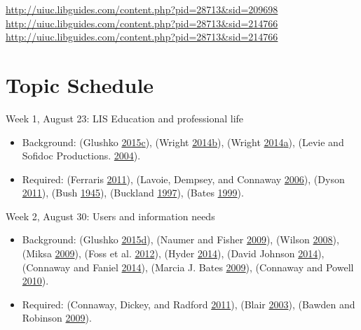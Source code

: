 \documentclass[]{article}
\providecommand{\tightlist}{%
  \setlength{\itemsep}{0pt}\setlength{\parskip}{0pt}}
\begin{document}
\url{http://uiuc.libguides.com/content.php?pid=28713\&sid=209698}
\url{http://uiuc.libguides.com/content.php?pid=28713\&sid=214766}
\url{http://uiuc.libguides.com/content.php?pid=28713\&sid=214766}

\section{Topic Schedule}\label{topic-schedule}

Week 1, August 23: LIS Education and professional life

\begin{itemize}
\tightlist
\item
  Background: (Glushko
  \protect\hyperlink{ref-glushkoux5ffoundationux5f2015}{2015}\protect\hyperlink{ref-glushkoux5ffoundationux5f2015}{c}),
  (Wright
  \protect\hyperlink{ref-wrightux5fsecretux5f2014}{2014}\protect\hyperlink{ref-wrightux5fsecretux5f2014}{b}),
  (Wright
  \protect\hyperlink{ref-wrightux5fcatalogingux5f2014}{2014}\protect\hyperlink{ref-wrightux5fcatalogingux5f2014}{a}),
  (Levie and Sofidoc Productions.
  \protect\hyperlink{ref-levieux5fmanux5f2004}{2004}).
\item
  Required: (Ferraris
  \protect\hyperlink{ref-ferrarisux5fsocialux5f2011}{2011}), (Lavoie,
  Dempsey, and Connaway
  \protect\hyperlink{ref-lavoieux5fmakingux5f2006}{2006}), (Dyson
  \protect\hyperlink{ref-dysonux5fhowux5f2011}{2011}), (Bush
  \protect\hyperlink{ref-bushux5fasux5f1945}{1945}), (Buckland
  \protect\hyperlink{ref-bucklandux5fwhatux5f1997}{1997}), (Bates
  \protect\hyperlink{ref-batesux5finvisibleux5f1999}{1999}).
\end{itemize}

Week 2, August 30: Users and information needs

\begin{itemize}
\tightlist
\item
  Background: (Glushko
  \protect\hyperlink{ref-glushkoux5finteractionsux5f2015}{2015}\protect\hyperlink{ref-glushkoux5finteractionsux5f2015}{d}),
  (Naumer and Fisher
  \protect\hyperlink{ref-naumerux5finformationux5f2009}{2009}), (Wilson
  \protect\hyperlink{ref-wilsonux5finformationux5f2008}{2008}), (Miksa
  \protect\hyperlink{ref-miksaux5finformationux5f2009}{2009}), (Foss et
  al. \protect\hyperlink{ref-fossux5fchildrensux5f2012}{2012}), (Hyder
  \protect\hyperlink{ref-hyderux5freadingux5f2014}{2014}), (David
  Johnson
  \protect\hyperlink{ref-davidux5fjohnsonux5fhealth-relatedux5f2014}{2014}),
  (Connaway and Faniel
  \protect\hyperlink{ref-connawayux5freorderingux5f2014}{2014}), (Marcia
  J. Bates
  \protect\hyperlink{ref-marciaux5fj.ux5fbatesux5finformationux5f2009}{2009}),
  (Connaway and Powell
  \protect\hyperlink{ref-connawayux5fselectingux5f2010}{2010}).
\item
  Required: (Connaway, Dickey, and Radford
  \protect\hyperlink{ref-connawayux5fifux5f2011}{2011}), (Blair
  \protect\hyperlink{ref-blairux5freadingux5f2003}{2003}), (Bawden and
  Robinson \protect\hyperlink{ref-bawdenux5fdarkux5f2009}{2009}).
\end{itemize}
\end{document}
